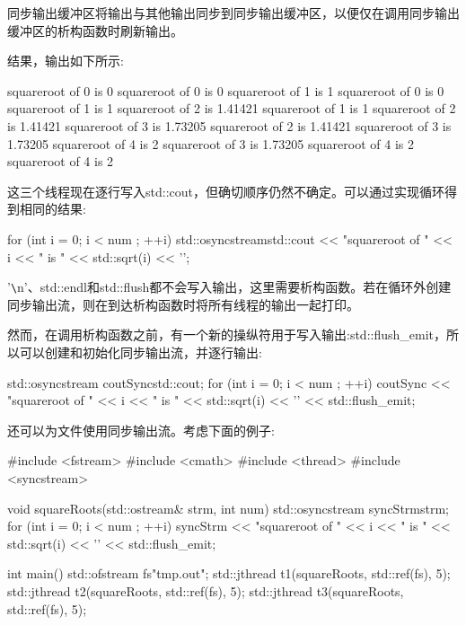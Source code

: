 同步输出缓冲区将输出与其他输出同步到同步输出缓冲区，以便仅在调用同步输出缓冲区的析构函数时刷新输出。

结果，输出如下所示:

\begin{shell}
squareroot of 0 is 0
squareroot of 0 is 0
squareroot of 1 is 1
squareroot of 0 is 0
squareroot of 1 is 1
squareroot of 2 is 1.41421
squareroot of 1 is 1
squareroot of 2 is 1.41421
squareroot of 3 is 1.73205
squareroot of 2 is 1.41421
squareroot of 3 is 1.73205
squareroot of 4 is 2
squareroot of 3 is 1.73205
squareroot of 4 is 2
squareroot of 4 is 2
\end{shell}

这三个线程现在逐行写入std::cout，但确切顺序仍然不确定。可以通过实现循环得到相同的结果:

\begin{cpp}
for (int i = 0; i < num ; ++i) {
	std::osyncstream{std::cout} << "squareroot of " << i << " is "
								<< std::sqrt(i) << '\n';
}
\end{cpp}

'\verb|\|n'、std::endl和std::flush都不会写入输出，这里需要析构函数。若在循环外创建同步输出流，则在到达析构函数时将所有线程的输出一起打印。

然而，在调用析构函数之前，有一个新的操纵符用于写入输出:std::flush\_emit，所以可以创建和初始化同步输出流，并逐行输出:

\begin{cpp}
std::osyncstream coutSync{std::cout};
for (int i = 0; i < num ; ++i) {
	coutSync << "squareroot of " << i << " is "
			 << std::sqrt(i) << '\n' << std::flush_emit;
}
\end{cpp}


还可以为文件使用同步输出流。考虑下面的例子:


\begin{cpp}
#include <fstream>
#include <cmath>
#include <thread>
#include <syncstream>

void squareRoots(std::ostream& strm, int num)
{
	std::osyncstream syncStrm{strm};
	for (int i = 0; i < num ; ++i) {
		syncStrm << "squareroot of " << i << " is "
				 << std::sqrt(i) << '\n' << std::flush_emit;
	}
}

int main()
{
	std::ofstream fs{"tmp.out"};
	std::jthread t1(squareRoots, std::ref(fs), 5);
	std::jthread t2(squareRoots, std::ref(fs), 5);
	std::jthread t3(squareRoots, std::ref(fs), 5);
}
\end{cpp}

